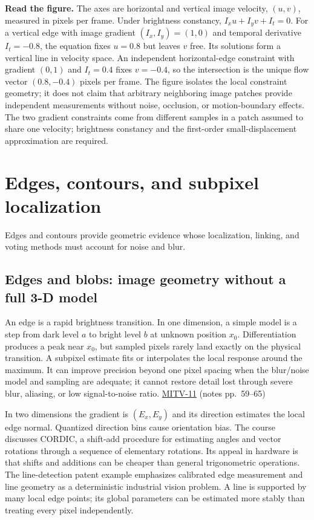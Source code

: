\textbf{Read the figure.} The axes are horizontal and vertical image velocity, \((u,v)\), measured in pixels per frame. Under brightness constancy, \(I_xu+I_yv+I_t=0\). For a vertical edge with image gradient \((I_x,I_y)=(1,0)\) and temporal derivative \(I_t=-0.8\), the equation fixes \(u=0.8\) but leaves \(v\) free. Its solutions form a vertical line in velocity space. An independent horizontal-edge constraint with gradient \((0,1)\) and \(I_t=0.4\) fixes \(v=-0.4\), so the intersection is the unique flow vector \((0.8,-0.4)\) pixels per frame. The figure isolates the local constraint geometry; it does not claim that arbitrary neighboring image patches provide independent measurements without noise, occlusion, or motion-boundary effects. The two gradient constraints come from different samples in a patch assumed to share one velocity; brightness constancy and the first-order small-displacement approximation are required.

\section{Edges, contours, and subpixel localization}\label{04-visual-computing-ii-ch030-edges-contours-and-subpixel-localization}

Edges and contours provide geometric evidence whose localization, linking, and voting methods must account for noise and blur.

\subsection{Edges and blobs: image geometry without a full 3-D model}\label{04-visual-computing-ii-ch030-edges-and-blobs-image-geometry-without-a-full-3-d-model}

An edge is a rapid brightness transition. In one dimension, a simple model is a step from dark level \(a\) to bright level \(b\) at unknown position \(x_0\). Differentiation produces a peak near \(x_0\), but sampled pixels rarely land exactly on the physical transition. A subpixel estimate fits or interpolates the local response around the maximum. It can improve precision beyond one pixel spacing when the blur/noise model and sampling are adequate; it cannot restore detail lost through severe blur, aliasing, or low signal-to-noise ratio. \hyperref[04-visual-computing-ii-ch036-mitv-11---edge-detection-subpixel-position-cordic-line-detection-us-6408109]{MITV-11} (notes pp.~59--65)

In two dimensions the gradient is \((E_x,E_y)\) and its direction estimates the local edge normal. Quantized direction bins cause orientation bias. The course discusses CORDIC, a shift-add procedure for estimating angles and vector rotations through a sequence of elementary rotations. Its appeal in hardware is that shifts and additions can be cheaper than general trigonometric operations. The line-detection patent example emphasizes calibrated edge measurement and line geometry as a deterministic industrial vision problem. A line is supported by many local edge points; its global parameters can be estimated more stably than treating every pixel independently.

